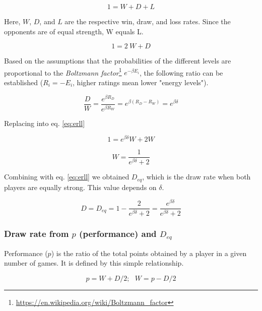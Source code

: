 \documentclass[12pt]{article}
\begin{document}
	\begin{equation} \label{eq:basic_WDL}
	1 = W + D + L
	\end{equation}

Here, $W$, $D$, and $L$ are the respective win, draw, and loss rates. Since the opponents are of equal strength, W equals L.

	\begin{equation} \label{eq:erll}
	1 = 2\: W + D 
	\end{equation}

Based on the assumptions that the probabilities of the different levels are proportional to the \textit{Boltzmann factor}\footnote{\url{https://en.wikipedia.org/wiki/Boltzmann_factor}} $e^{-\beta E_{i}}$, the following ratio can be established ($R_{i}=-E_{i}$, higher ratings mean lower "energy levels").

	\begin{equation} 
	\frac{D}{W} = \frac{e^{\beta R_{D}}}{e^{\beta R_{W}}}  = e^{\beta(R_{D}-R_{W})} = e^{\beta\delta}
	\end{equation}

Replacing into eq. \ref{eq:erll}

	\begin{equation} 
	1 = e^{\beta\delta} W + 2W
	\end{equation}

	\begin{equation} \label{eq:wdep}
	W = \frac{1}{e^{\beta\delta} + 2}
	\end{equation}

Combining with eq. \ref{eq:erll} we obtained $D_{eq}$, which is the draw rate when both players are equally strong. This value depends on $\delta$.

	\begin{equation} \label{eq:eqlog}
	D = D_{eq} = 1 - \frac {2}{e^{\beta\delta} + 2} = \frac{e^{\beta\delta}}{e^{\beta\delta}+2}
	\end{equation}

\subsubsection*{Draw rate from $p$ (performance) and $D_{eq}$}

Performance ($p$) is the ratio of the total points obtained by a player in a given number of games. 
It is defined by this simple relationship.

	\begin{equation} \label{eq:deq_perf}
	p = W + D/2;\:\:\: W = p - D/2
	\end{equation}
\end{document}
